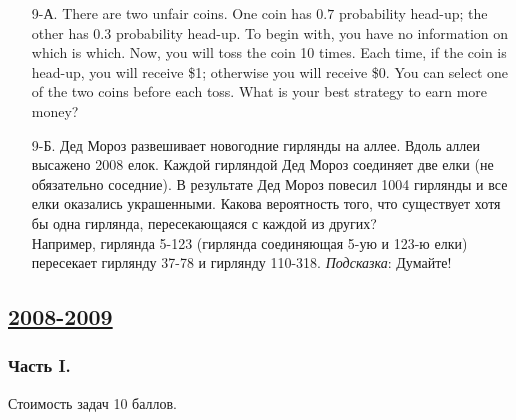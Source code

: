 \begin{enumerate}
\item[9-А.] There are two unfair coins. One coin has $0.7$ probability head-up;
the other has $0.3$ probability head-up. To begin with, you have no information
on which is which. Now, you will toss the coin 10 times. Each time, if the coin is
head-up, you will receive \$1; otherwise you will receive \$0. You can select one
of the two coins before each toss. What is your best strategy to earn more money?
\item[9-Б.] Дед Мороз развешивает новогодние гирлянды на аллее. Вдоль аллеи высажено
2008 елок. Каждой гирляндой Дед Мороз соединяет две елки (не обязательно соседние).
В результате Дед Мороз повесил 1004 гирлянды и все елки оказались украшенными.
Какова вероятность того, что существует хотя бы одна гирлянда, пересекающаяся с
каждой из других? \\
Например, гирлянда 5-123 (гирлянда соединяющая 5-ую и 123-ю елки) пересекает гирлянду
37-78 и гирлянду 110-318.
\emph{Подсказка}: Думайте!
\end{enumerate}



\newpage
\subsection[2008-2009]{\hyperref[sec:sol_kr_01_2008_2009]{2008-2009}}
\label{sec:kr_01_2008_2009}

\subsubsection*{Часть I.}

Стоимость задач 10 баллов.

